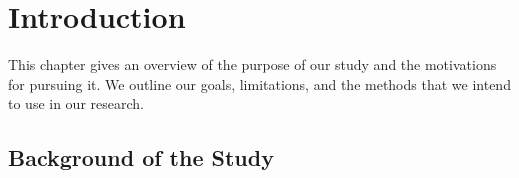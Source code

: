 %
%
%                 

\chapter{Introduction}
\label{sec:intro}    %

This chapter gives an overview of the purpose of our study and the motivations for pursuing it. We outline our goals, limitations, and the methods that we intend to use in our research.




\section{Background of the Study}
\label{sec:overview}

%
%





